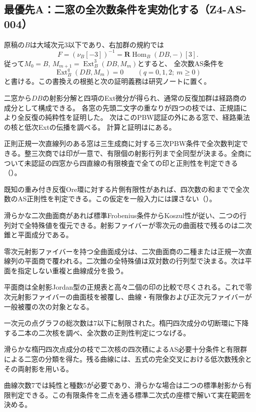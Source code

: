 \documentclass[11pt,a4paper]{ltjsarticle}
\begin{document}
\subsection{最優先A：二窓の全次数条件を実効化する（Z4-AS-004）}
原稿の$B$は大域次元3以下であり、右加群の規約では
\[
 F=(\nu_B[-3])^{-1}=\mathbf R\operatorname{Hom}_B(DB,-)[3].
\]
従って$M_0=B$, $M_{m+1}=\operatorname{Ext}_B^3(DB,M_m)$とすると、
全次数AS条件を
\[
 \operatorname{Ext}_B^q(DB,M_m)=0\qquad(q=0,1,2;\ m\ge0)
\]
と書ける。この書換えの根拠と次の証明義務は研究ノートに置く。

二窓から$DB$の射影分解と四項のExt微分が得られ、通常の反復加群は経路商の成分として構成できる。
各窓の先頭二文字の重なりが四つの枝では、正規語により全反復の純粋性を証明した。
次はこのPBW認証の外にある窓で、経路乗法の核と低次Extの伝播を調べる。
計算と証明はにある。

正則正規一次直線列のある窓は三生成商に対する三次PBW条件で全次数判定できる。整三次商では印が一意で、有限個の射影行列まで全同型が決まる。全商について未認証の四窓から四直線の有限検査で全ての印と正則性を判定できる（）。

既知の重み付き反復Ore環に対する片側有限性があれば、四次数の和までで全次数のAS正則性を判定できる。この仮定を一般入力には課さない（）。

滑らかな二次曲面商があれば標準Frobenius条件からKoszul性が従い、二つの行列対で全特殊値を復元できる。射影ファイバーが零次元の曲面枝で残るのは二次錐と平面成分である。

零次元射影ファイバーを持つ全曲面成分は、二次曲面商の二種または正規一次直線列の平面商で覆われる。二次錐の全特殊値は双対数の行列型で決まる。次は平面を指定しない重複と曲線成分を扱う。

平面商は全射影Jordan型の正規表と高々二個の印の比較で尽くされる。これで零次元射影ファイバーの曲面枝を被覆し、曲線・有限像および正次元ファイバーが一般被覆の次の対象となる。

一次元の点グラフの総次数は7以下に制限された。楕円四次成分の切断環に下降する二本の二次核を調べ、全次数の正則性判定につなげる。

滑らかな楕円四次点成分の枝で二次核の四次積によるAS必要十分条件と有限群による二窓の分類を得た。残る曲線には、五式の完全交叉における低次数残余とその両射影を用いる。

曲線次数7では純性と種数5が必要であり、滑らかな場合は二つの標準射影から有限判定できる。この有限条件を二点を通る標準二次式の座標で解いて実在範囲を決める。
\end{document}
